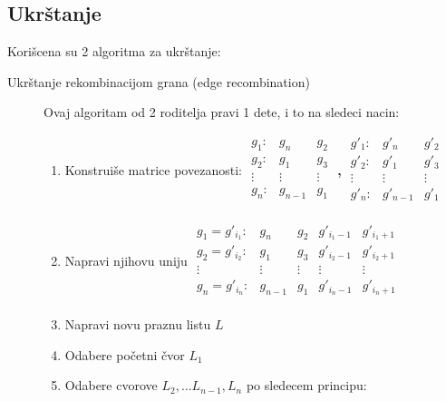 \documentclass[titlepage]{article}
\theoremstyle{remark}
\theoremstyle{definition}
\begin{document}
        \subsection{Ukr\v{s}tanje}
        Kori\v{s}cena su 2 algoritma za ukr\v{s}tanje:
        \begin{description}
          \item[Ukr\v{s}tanje rekombinacijom grana (edge recombination)]
            Ovaj algoritam od 2 roditelja pravi 1 dete, i to na sledeci nacin:
            \begin{enumerate}
              \item Konstrui\v{s}e matrice povezanosti:
              $\begin{array}{ccc}
                g_1: & g_n & g_2 \\
                g_2: & g_1 & g_3 \\
                \vdots & \vdots & \vdots \\
                g_n: & g_{n-1} & g_1  \\
              \end{array}$
              \textbf{,}
              $\begin{array}{ccc}
                g'_1: & g'_n & g'_2 \\
                g'_2: & g'_1 & g'_3 \\
                \vdots & \vdots & \vdots \\
                g'_n: & g'_{n-1} & g'_1  \\
              \end{array}$
              \item Napravi njihovu uniju
               $\begin{array}{ccccc}
                g_1 = g'_{i_1}: & g_n & g_2 & g'_{i_{1}-1} & g'_{i_{1}+1} \\
                g_2 = g'_{i_2}: & g_1 & g_3 & g'_{i_{2}-1} & g'_{i_{2}+1} \\
                \vdots & \vdots & \vdots & \vdots & \vdots \\
                g_n = g'_{i_n}: & g_{n-1} & g_1 & g'_{i_{n}-1} & g'_{i_{n}+1}  \\
              \end{array}$
              \item Napravi novu praznu listu $L$
              \item Odabere po\v{c}etni \v{c}vor $L_1$
              \item Odabere cvorove $L_2, \ldots L_{n-1}, L_n$ po sledecem principu:\\

\end{enumerate}
\end{description}
\end{document}

